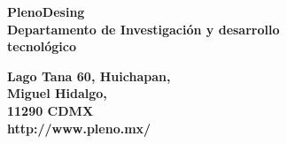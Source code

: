 \thispagestyle{empty} %
\vspace*{\fill}
\sffamily

\Large{
\noindent
\textbf{PlenoDesing}\\
\textbf{Departamento de Investigación y desarrollo\\ tecnológico}\\
}

\small
\noindent
\textbf{Lago Tana 60, Huichapan,\\ Miguel Hidalgo,\\ 11290 CDMX}\\
\textbf{http://www.pleno.mx/}\\
\\

